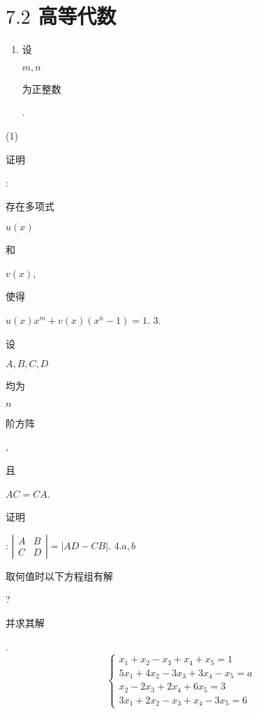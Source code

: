\documentclass[10pt]{article}
\begin{document}
\section{$7.2$ 高等代数}
\begin{enumerate}
  \item \begin{CJK}{UTF8}{mj}设\end{CJK} $m, n$ \begin{CJK}{UTF8}{mj}为正整数\end{CJK}.
\end{enumerate}
(1) \begin{CJK}{UTF8}{mj}证明\end{CJK}: \begin{CJK}{UTF8}{mj}存在多项式\end{CJK} $u(x)$ \begin{CJK}{UTF8}{mj}和\end{CJK} $v(x)$, \begin{CJK}{UTF8}{mj}使得\end{CJK} $u(x) x^{m}+v(x)\left(x^{n}-1\right)=1$. 3. \begin{CJK}{UTF8}{mj}设\end{CJK} $A, B, C, D$ \begin{CJK}{UTF8}{mj}均为\end{CJK} $n$ \begin{CJK}{UTF8}{mj}阶方阵\end{CJK}, \begin{CJK}{UTF8}{mj}且\end{CJK} $A C=C A$. \begin{CJK}{UTF8}{mj}证明\end{CJK}: $\left|\begin{array}{ll}A & B \\ C & D\end{array}\right|=|A D-C B|$. $4 . a, b$ \begin{CJK}{UTF8}{mj}取何值时以下方程组有解\end{CJK}? \begin{CJK}{UTF8}{mj}并求其解\end{CJK}.
$$
\left\{\begin{array}{l}
x_{1}+x_{2}-x_{3}+x_{4}+x_{5}=1 \\
5 x_{1}+4 x_{2}-3 x_{3}+3 x_{4}-x_{5}=a \\
x_{2}-2 x_{3}+2 x_{4}+6 x_{5}=3 \\
3 x_{1}+2 x_{2}-x_{3}+x_{4}-3 x_{5}=6
\end{array}\right.
$$
\end{document}
